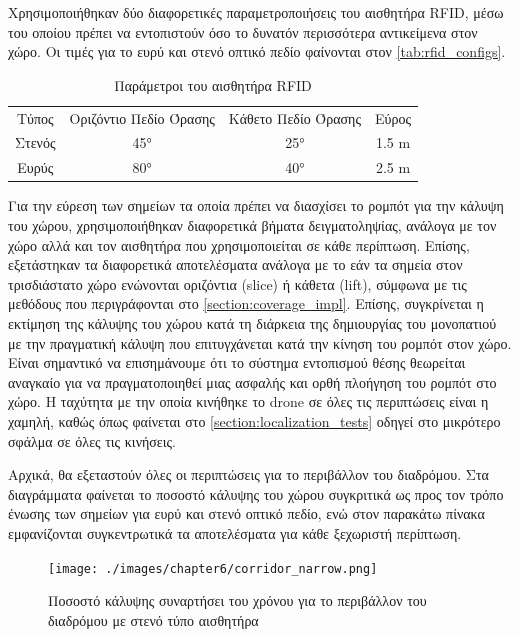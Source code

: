 Χρησιμοποιήθηκαν δύο διαφορετικές παραμετροποιήσεις του αισθητήρα RFID, μέσω του οποίου πρέπει να εντοπιστούν όσο το δυνατόν περισσότερα αντικείμενα στον χώρο. Οι τιμές για το ευρύ και στενό οπτικό πεδίο φαίνονται στον \autoref{tab:rfid_configs}.

\begin{table}[H]
    \begin{center}
        \caption{Παράμετροι του αισθητήρα RFID}
        \label{tab:rfid_configs}
        \begin{tabular}{ | c | c | c | c |}
        \hline
        \rowcolor{Gray}
        Τύπος & Οριζόντιο Πεδίο Όρασης & Κάθετο Πεδίο Όρασης & Εύρος\\
        Στενός & \ang{45} & \ang{25} & 1.5 \si{m} \\
        Ευρύς & \ang{80} & \ang{40} & 2.5 \si{m} \\
        \hline
        \end{tabular}
    \end{center}
\end{table}

Για την εύρεση των σημείων τα οποία πρέπει να διασχίσει το ρομπότ για την κάλυψη του χώρου, χρησιμοποιήθηκαν διαφορετικά βήματα δειγματοληψίας, ανάλογα με τον χώρο αλλά και τον αισθητήρα που χρησιμοποιείται σε κάθε περίπτωση. Επίσης, εξετάστηκαν τα διαφορετικά αποτελέσματα ανάλογα με το εάν τα σημεία στον τρισδιάστατο χώρο ενώνονται οριζόντια (slice) ή κάθετα (lift), σύμφωνα με τις μεθόδους που περιγράφονται στο \autoref{section:coverage_impl}. Επίσης, συγκρίνεται η εκτίμηση της κάλυψης του χώρου κατά τη διάρκεια της δημιουργίας του μονοπατιού με την πραγματική κάλυψη που επιτυγχάνεται κατά την κίνηση του ρομπότ στον χώρο. Είναι σημαντικό να επισημάνουμε ότι το σύστημα εντοπισμού θέσης θεωρείται αναγκαίο για να πραγματοποιηθεί μιας ασφαλής και ορθή πλοήγηση του ρομπότ στο χώρο. Η ταχύτητα με την οποία κινήθηκε το drone σε όλες τις περιπτώσεις είναι η χαμηλή, καθώς όπως φαίνεται στο \autoref{section:localization_tests} οδηγεί στο μικρότερο σφάλμα σε όλες τις κινήσεις.

Αρχικά, θα εξεταστούν όλες οι περιπτώσεις για το περιβάλλον του διαδρόμου. Στα διαγράμματα φαίνεται το ποσοστό κάλυψης του χώρου συγκριτικά ως προς τον τρόπο ένωσης των σημείων για ευρύ και στενό οπτικό πεδίο, ενώ στον παρακάτω πίνακα εμφανίζονται συγκεντρωτικά τα αποτελέσματα για κάθε ξεχωριστή περίπτωση.

\begin{figure}[!ht]
    \texttt{[image: ./images/chapter6/corridor\_narrow.png]}
    \caption{Ποσοστό κάλυψης συναρτήσει του χρόνου για το περιβάλλον του διαδρόμου με στενό τύπο αισθητήρα}
     \label{fig:corridor_narrow}
\end{figure} 

